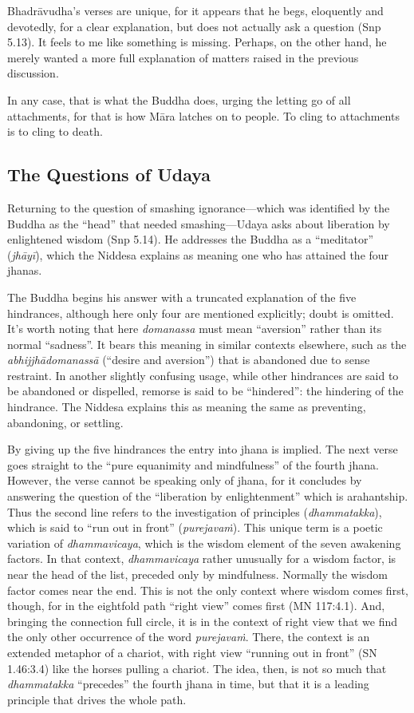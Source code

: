 \documentclass[12pt,openany]{book}%
\begin{document}
\textsanskrit{Bhadrāvudha}’s verses are unique, for it appears that he begs, eloquently and devotedly, for a clear explanation, but does not actually ask a question (Snp 5.13). It feels to me like something is missing. Perhaps, on the other hand, he merely wanted a more full explanation of matters raised in the previous discussion.

In any case, that is what the Buddha does, urging the letting go of all attachments, for that is how \textsanskrit{Māra} latches on to people. To cling to attachments is to cling to death.

\subsection*{The Questions of Udaya}

Returning to the question of smashing ignorance—which was identified by the Buddha as the “head” that needed smashing—Udaya asks about liberation by enlightened wisdom (Snp 5.14). He addresses the Buddha as a “meditator” (\textit{\textsanskrit{jhāyī}}), which the Niddesa explains as meaning one who has attained the four jhanas.

The Buddha begins his answer with a truncated explanation of the five hindrances, although here only four are mentioned explicitly; doubt is omitted. It’s worth noting that here \textit{domanassa} must mean “aversion” rather than its normal “sadness”. It bears this meaning in similar contexts elsewhere, such as the \textit{\textsanskrit{abhijjhādomanassā}} (“desire and aversion”) that is abandoned due to sense restraint. In another slightly confusing usage, while other hindrances are said to be abandoned or dispelled, remorse is said to be “hindered”: the hindering of the hindrance. The Niddesa explains this as meaning the same as preventing, abandoning, or settling.

By giving up the five hindrances the entry into jhana is implied. The next verse goes straight to the “pure equanimity and mindfulness” of the fourth jhana. However, the verse cannot be speaking only of jhana, for it concludes by answering the question of the “liberation by enlightenment” which is arahantship. Thus the second line refers to the investigation of principles (\textit{dhammatakka}), which is said to “run out in front” (\textit{\textsanskrit{purejavaṁ}}). This unique term is a poetic variation of \textit{dhammavicaya}, which is the wisdom element of the seven awakening factors. In that context, \textit{dhammavicaya} rather unusually for a wisdom factor, is near the head of the list, preceded only by mindfulness. Normally the wisdom factor comes near the end. This is not the only context where wisdom comes first, though, for in the eightfold path “right view” comes first (MN 117:4.1). And, bringing the connection full circle, it is in the context of right view that we find the only other occurrence of the word \textit{\textsanskrit{purejavaṁ}}. There, the context is an extended metaphor of a chariot, with right view “running out in front” (SN 1.46:3.4) like the horses pulling a chariot. The idea, then, is not so much that \textit{dhammatakka} “precedes” the fourth jhana in time, but that it is a leading principle that drives the whole path.
\end{document}
